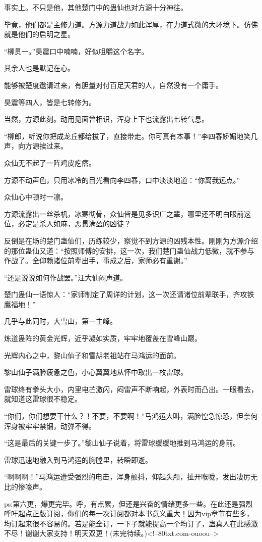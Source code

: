\begin{this_body}
事实上。不只是他，其他楚门中的蛊仙也对方源十分神往。

毕竟，他们都是主修力道。方源力道战力如此浑厚，在力道式微的大环境下。仿佛就是他们的启明之星。

“柳贯一。”昊震口中喃喃，好似咀嚼这个名字。

其余人也是默记在心。

能够被楚度邀请过来，有胆量对付百足天君的人，自然没有一个庸手。

昊震等四人，皆是七转修为。

当然，方源此刻。动用见面曾相识，浑身上下也流露出七转气息。

“柳郎，听说你把成龙丘都给拔了，直接带走。你可真有本事！”李四春娇媚地笑几声，向方源挨过来。

众仙无不起了一阵鸡皮疙瘩。

方源不动声色，只用冰冷的目光看向李四春，口中淡淡地道：“你离我远点。”

众仙心中顿时一凛。

方源流露出一丝杀机，冰寒彻骨，众仙皆是见多识广之辈，哪里还不明白眼前这位，必定是杀人如麻，恶贯满盈的凶徒？

反倒是在场的楚门蛊仙们，历练较少，察觉不到方源的凶残本性。刚刚为方源介绍的那位蛊仙又道：“按照师傅的安排，这一次，我们楚门蛊仙战力低微，就不参与作战了。全仰赖诸位前辈出手，事成之后，家师必有重谢。”

“还是说说如何作战罢。”汪大仙闷声道。

楚门蛊仙一语惊人：“家师制定了周详的计划，这一次还请诸位前辈联手，齐攻铁鹰福地！”

几乎与此同时，大雪山，第一主峰。

炼道蛊阵的黄金光辉，近乎凝如实质，牢牢地覆盖在雪峰山巅。

光辉内心之中，黎山仙子和雪胡老祖站在马鸿运的面前。

黎山仙子满脸疲惫之色，小心翼翼地从怀中取出一枚雷球。

雷球终有拳头大小，内里电芒激闪，闷雷声不断响起，外表时而凸出。一眼看去，就知道这雷球很不稳定。

“你们，你们想要干什么？！不要，不要啊！”马鸿运大叫，满脸惶急惊恐，但奈何浑身被牢牢禁锢，动弹不得。

“这是最后的关键一步了。”黎山仙子说着，将雷球缓缓地推到马鸿运的身前。

雷球迅速地融入到马鸿运的胸膛里，转瞬即逝。

“啊啊啊！”马鸿运遭受强烈的电击，浑身颤抖，仰起头颅，扯开喉咙，发出凄厉无比的惨嚎声。

ps:第六更，爆更完毕。呼，有点累，但还是兴奋的情绪更多一些。在此还是强烈呼吁起点正版订阅，你们的每一次订阅都对本书意义重大！因为vip章节有些多，均订起来很不容易的。若是能全订，一下子就能提高一个均订了，蛊真人在此感激不尽！谢谢大家支持！明天双更！(未完待续。)<!--80txt.com-ouoou-->

\end{this_body}

